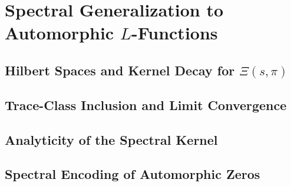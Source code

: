 \section{Spectral Generalization to Automorphic \texorpdfstring{$L$}{L}-Functions}
\label{sec:spectral_generalization}




\subsection{Hilbert Spaces and Kernel Decay for \texorpdfstring{$\Xi(s,\pi)$}{Xi(s, pi)}}






\subsection{Trace-Class Inclusion and Limit Convergence}




\subsection{Analyticity of the Spectral Kernel}




\subsection{Spectral Encoding of Automorphic Zeros}




